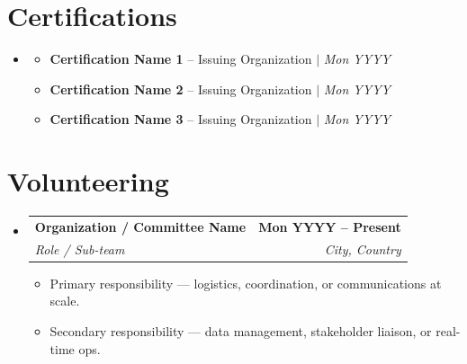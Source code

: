 \documentclass[A4,10pt]{article}
\makeatletter
\newcommand{\resumeItem}[1]{
  \item\small{#1 \vspace{-2pt}}
}
\newcommand{\resumeSubheading}[4]{
  \vspace{-2pt}\item
    \begin{tabular*}{1.0\textwidth}[t]{l@{\extracolsep{\fill}}r}
      \textbf{#1} & \textbf{\small #2} \\
      \textit{\small#3} & \textit{\small #4} \\
    \end{tabular*}\vspace{-7pt}
}
\newcommand{\resumeSubHeadingListStart}{\begin{itemize}[leftmargin=0.0in, label={}]}
\newcommand{\resumeSubHeadingListEnd}{\end{itemize}}
\newcommand{\resumeItemListStart}{\begin{itemize}[leftmargin=0.15in]}
\newcommand{\resumeItemListEnd}{\end{itemize}\vspace{-5pt}}
\makeatother
\begin{document}
\section{Certifications}
\resumeSubHeadingListStart
  \item
  \resumeItemListStart
    \resumeItem{\textbf{Certification Name 1} -- Issuing Organization $|$ \textit{Mon YYYY}}
    \resumeItem{\textbf{Certification Name 2} -- Issuing Organization $|$ \textit{Mon YYYY}}
    \resumeItem{\textbf{Certification Name 3} -- Issuing Organization $|$ \textit{Mon YYYY}}
  \resumeItemListEnd
\resumeSubHeadingListEnd

\section{Volunteering}
\resumeSubHeadingListStart

  \resumeSubheading
    {Organization / Committee Name}{Mon YYYY -- Present}
    {Role / Sub-team}{City, Country}
    \resumeItemListStart
      \resumeItem{Primary responsibility — logistics, coordination, or communications at scale.}
      \resumeItem{Secondary responsibility — data management, stakeholder liaison, or real-time ops.}
    \resumeItemListEnd

\resumeSubHeadingListEnd
\end{document}
